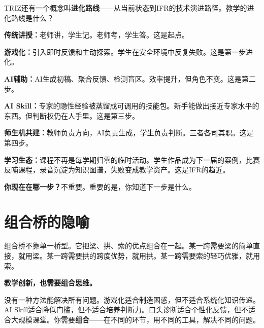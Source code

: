 TRIZ还有一个概念叫\textbf{进化路线}——从当前状态到IFR的技术演进路径。教学的进化路线是什么？

\begin{center}
\end{center}

\textbf{传统讲授：}老师讲，学生记。老师考，学生答。这是起点。

\textbf{游戏化：}引入即时反馈和主动探索。学生在安全环境中反复失败。这是第一步进化。

\textbf{AI辅助：}AI生成初稿、聚合反馈、检测盲区。效率提升，但角色不变。这是第二步。

\textbf{AI Skill：}专家的隐性经验被蒸馏成可调用的技能包。新手能做出接近专家水平的东西。但判断权仍在人手里。这是第三步。

\textbf{师生机共建：}教师负责方向，AI负责生成，学生负责判断。三者各司其职。这是第四步。

\textbf{学习生态：}课程不再是每学期归零的临时活动。学生作品成为下一届的案例，比赛反哺课程，录音沉淀为知识图谱，失败变成教学资产。这是IFR的趋近。

\textbf{你现在在哪一步？}不重要。重要的是，你知道下一步是什么。

\section{组合桥的隐喻}

组合桥不靠单一桥型。它把梁、拱、索的优点组合在一起。某一跨需要梁的简单直接，就用梁。某一跨需要拱的跨度优势，就用拱。某一跨需要索的轻巧优雅，就用索。

\textbf{教学创新，也需要组合思维。}

没有一种方法能解决所有问题。游戏化适合制造困惑，但不适合系统化知识传递。AI Skill适合降低门槛，但不适合培养判断力。口头诊断适合个性化反馈，但不适合大规模课堂。你需要\textbf{组合}——在不同的环节，用不同的工具，解决不同的问题。

